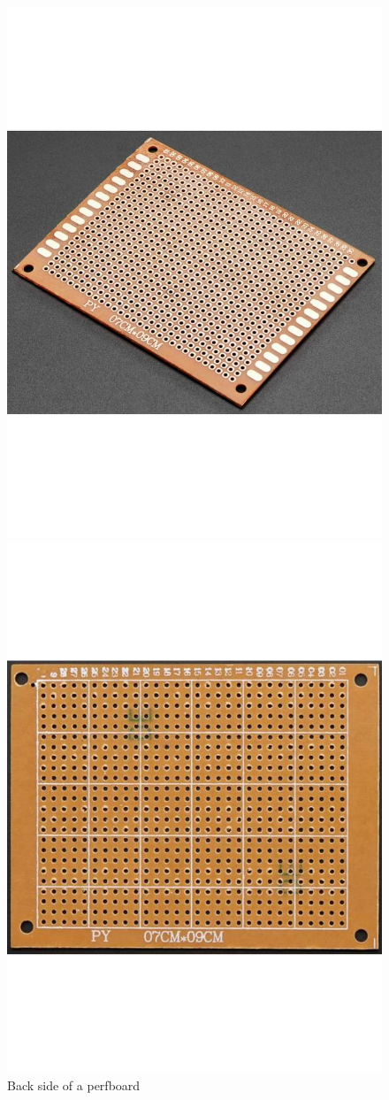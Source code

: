 \begin{figure}[h]
    \centering
    \begin{minipage}[b]{0.45\textwidth}
        \centering
        \includegraphics[width=.8\textwidth]{Imagenes/Vectorial/perfboard_back.pdf}
        \caption{Back side of a perfboard}
        \label{fig:perfboard_back}
    \end{minipage}
    \hfill
    \begin{minipage}[b]{0.45\textwidth}
        \centering
        \includegraphics[width=.8\textwidth]{Imagenes/Vectorial/perfboard_front.pdf}

\end{minipage}
\end{figure}
